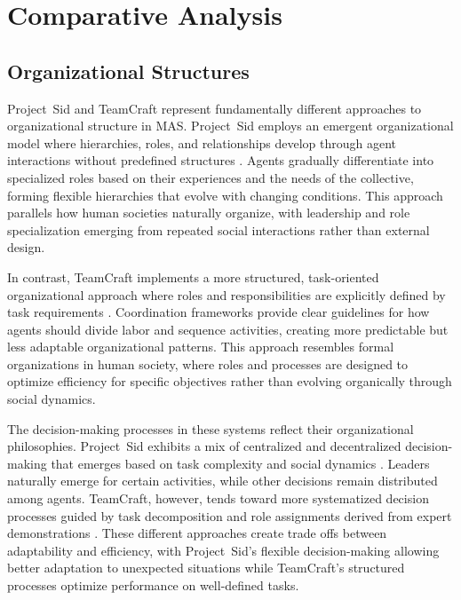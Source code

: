 \documentclass[a4paper, 12pt]{article}
\begin{document}
\section{Comparative Analysis}

\subsection{Organizational Structures}

Project~Sid and TeamCraft represent fundamentally different approaches to organizational structure in MAS. Project~Sid employs an emergent organizational model where hierarchies, roles, and relationships develop through agent interactions without predefined structures \autocite{Altera2024}. Agents gradually differentiate into specialized roles based on their experiences and the needs of the collective, forming flexible hierarchies that evolve with changing conditions. This approach parallels how human societies naturally organize, with leadership and role specialization emerging from repeated social interactions rather than external design.

In contrast, TeamCraft implements a more structured, task-oriented organizational approach where roles and responsibilities are explicitly defined by task requirements \autocite{Long2024}. Coordination frameworks provide clear guidelines for how agents should divide labor and sequence activities, creating more predictable but less adaptable organizational patterns. This approach resembles formal organizations in human society, where roles and processes are designed to optimize efficiency for specific objectives rather than evolving organically through social dynamics.

The decision-making processes in these systems reflect their organizational philosophies. Project~Sid exhibits a mix of centralized and decentralized decision-making that emerges based on task complexity and social dynamics \autocite{Altera2024}. Leaders naturally emerge for certain activities, while other decisions remain distributed among agents. TeamCraft, however, tends toward more systematized decision processes guided by task decomposition and role assignments derived from expert demonstrations \autocite{Long2024}. These different approaches create trade offs between adaptability and efficiency, with Project~Sid's flexible decision-making allowing better adaptation to unexpected situations while TeamCraft's structured processes optimize performance on well-defined tasks.
\end{document}
